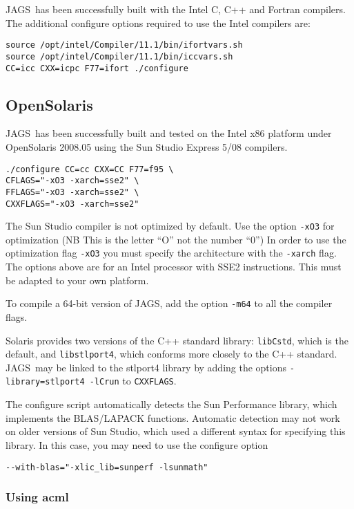 \documentclass[11pt, a4paper, titlepage]{article}
\newcommand{\JAGS}{\textsf{JAGS}}
\begin{document}
\JAGS\ has been successfully built with the Intel C, C++ and Fortran
compilers.  The additional configure options required to use the Intel
compilers are:
\begin{verbatim}
source /opt/intel/Compiler/11.1/bin/ifortvars.sh
source /opt/intel/Compiler/11.1/bin/iccvars.sh
CC=icc CXX=icpc F77=ifort ./configure 
\end{verbatim}

\subsection{OpenSolaris}

\JAGS\ has been successfully built and tested on the Intel x86
platform under OpenSolaris 2008.05 using the Sun Studio Express 5/08
compilers.
\begin{verbatim}
./configure CC=cc CXX=CC F77=f95 \
CFLAGS="-xO3 -xarch=sse2" \
FFLAGS="-xO3 -xarch=sse2" \
CXXFLAGS="-xO3 -xarch=sse2"
\end{verbatim}
The Sun Studio compiler is not optimized by default. Use the option
\verb+-xO3+ for optimization (NB This is the letter ``O'' not the
number ``0'') In order to use the optimization flag \verb+-xO3+ you
must specify the architecture with the \verb+-xarch+ flag. The options
above are for an Intel processor with SSE2 instructions. This must be
adapted to your own platform.

To compile a 64-bit version of JAGS, add the option \verb+-m64+ to
all the compiler flags.

Solaris provides two versions of the C++ standard library:
\texttt{libCstd}, which is the default, and \texttt{libstlport4},
which conforms more closely to the C++ standard. \JAGS\ may be linked
to the stlport4 library by adding the options
\verb+-library=stlport4 -lCrun+ to \verb+CXXFLAGS+.

The configure script automatically detects the Sun Performance library,
which implements the BLAS/LAPACK functions.  Automatic detection may
not work on older versions of Sun Studio, which used a different syntax
for specifying this library.  In this case, you may need to use the
configure option
\begin{verbatim}
--with-blas="-xlic_lib=sunperf -lsunmath"
\end{verbatim}

\subsubsection{Using acml}
\end{document}
